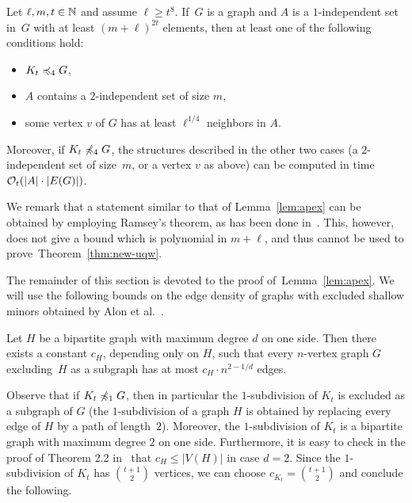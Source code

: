 \begin{lemma}\label{lem:apex}
  Let $\ell,m,t\in \mathbb{N}$ and assume $\ell\geq t^{8}$.  If~$G$ is a graph
  and $A$ is a $1$-independent set in~$G$ with at least
  $(m+\ell)^{2t}$ elements, then at least one of the following
  conditions hold:
  \begin{itemize}
  \item $K_t\preccurlyeq_{4} G$,
  \item $A$ contains a $2$-independent set of size $m$,
  \item some vertex $v$ of $G$ has at least $\ell^{1/4}$ neighbors in
    $A$.
  \end{itemize}
  Moreover, if $K_t\not\preccurlyeq_4G$, the structures described in the
  other two cases (a $2$-independent set of size~$m$, or a vertex $v$
  as above) can be computed in time $\mathcal{O}_t(|A|\cdot |E(G)|)$.
\end{lemma}
We remark that a statement similar to that of Lemma~\ref{lem:apex} can
be obtained by employing Ramsey's theorem, as has been done
in~\cite{nevsetvril2011nowhere}. This, however,
does not give a bound which is polynomial in $m+\ell$, and thus cannot
be used to prove~Theorem~\ref{thm:new-uqw}.

\medskip The remainder of this section is devoted to the proof
of~Lemma~\ref{lem:apex}.  We will use the following bounds on the edge
density of graphs with excluded shallow minors obtained by Alon et
al.~\cite{alon2003turan}.

\begin{lemma}\label{lem:densitynd}
  Let $H$ be a bipartite graph with maximum degree $d$ on one
  side. Then there exists a constant $c_H$, depending only on $H$,
  such that every $n$-vertex graph $G$ excluding~$H$ as a subgraph has
  at most $c_H\cdot n^{2-1/d}$ edges.
\end{lemma} 

Observe that if $K_t\not\preccurlyeq_1G$, then in particular the
$1$-subdivision of $K_t$ is excluded as a subgraph of $G$ (the
$1$-subdivision of a graph $H$ is obtained by replacing every edge of
$H$ by a path of length~$2$).  Moreover, the $1$-subdivision of $K_t$
is a bipartite graph with maximum degree $2$ on one side. Furthermore,
it is easy to check in the proof of Theorem 2.2
in~\cite{alon2003turan} that $c_H\leq |V(H)|$ in case $d=2$. Since the
$1$-subdivision of $K_t$ has $\binom{t+1}{2}$ vertices, we can choose
$c_{K_t}=\binom{t+1}{2}$ and conclude the following.

